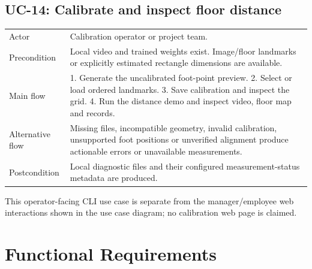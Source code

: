 \subsection*{UC-14: Calibrate and inspect floor distance}
\begin{tabular}{P{0.22\textwidth}P{0.68\textwidth}}
\toprule
Actor & Calibration operator or project team.\\
Precondition & Local video and trained weights exist. Image/floor landmarks or explicitly estimated rectangle dimensions are available.\\
Main flow & 1. Generate the uncalibrated foot-point preview. 2. Select or load ordered landmarks. 3. Save calibration and inspect the grid. 4. Run the distance demo and inspect video, floor map and records.\\
Alternative flow & Missing files, incompatible geometry, invalid calibration, unsupported foot positions or unverified alignment produce actionable errors or unavailable measurements.\\
Postcondition & Local diagnostic files and their configured measurement-status metadata are produced.\\
\bottomrule
\end{tabular}

This operator-facing CLI use case is separate from the manager/employee web interactions shown in the use case diagram; no calibration web page is claimed.

\section{Functional Requirements}
